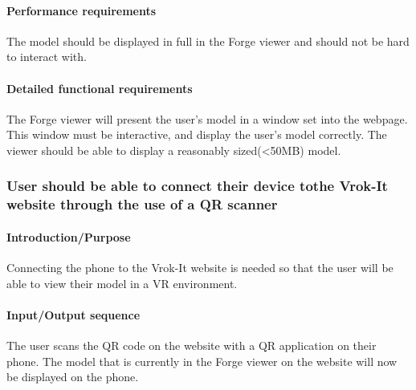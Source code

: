 \documentclass[letterpaper, 10pt, draftclsnofoot, compsoc, onecolumn]{IEEEtran}
\begin{document}
\paragraph[Performance requirements of this
feature]{\rmfamily\bfseries\color{black}
Performance requirements }
{\color{black}
	The model should be displayed in full in the Forge viewer and should not be hard to interact with. 
}

\paragraph[Detailed functional requirements of this
feature]{\rmfamily\bfseries\color{black}
Detailed functional requirements }
{\color{black}
	The Forge viewer will present the user's model in a window set into the webpage. This window must be interactive, and display the 
	user's model correctly. The viewer should be able to display a reasonably sized(<50MB) model. 
}


\subsubsection[{Smartphone Connection}]{\rmfamily\bfseries\color{black} User should be able to connect their 
	device tothe Vrok-It website through the use of a QR scanner
}

\paragraph[Introduction/Purpose of this
feature]{\rmfamily\bfseries\color{black}
Introduction/Purpose }
{\color{black}
	Connecting the phone to the Vrok-It website is needed so that the user will be able to view their model in a VR environment. 
}

\paragraph[Input/Output sequence for this
feature]{\rmfamily\bfseries\color{black}
Input/Output sequence }
{\color{black}
	The user scans the QR code on the website with a QR application on their phone. The model that is currently in the Forge viewer 
	on the website will now be displayed on the phone. 
}
\end{document}
